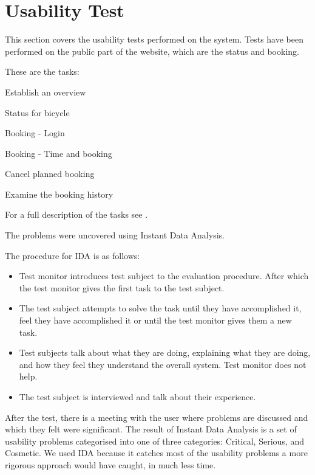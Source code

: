 \section{Usability Test}
This section covers the usability tests performed on the system.
Tests have been performed on the public part of the website, which are the status and booking.

These are the tasks:

\begin{description}[style=nextline]
\item[Task 1] Establish an overview
\item[Task 2] Status for bicycle
\item[Task 3] Booking - Login
\item[Task 4] Booking - Time and booking
\item[Task 5] Cancel planned booking
\item[Task 6] Examine the booking history
\end{description}
For a full description of the tasks see .

The problems were uncovered using Instant Data Analysis.

The procedure for IDA is as follows:

\begin{itemize}
\item Test monitor introduces test subject to the evaluation procedure. After which the test monitor gives the first task to the test subject.
\item The test subject attempts to solve the task until they have accomplished it, feel they have accomplished it or until the test monitor gives them a new task.
\item Test subjects talk about what they are doing, explaining what they are doing, and how they feel they understand the overall system. Test monitor does not help.
\item The test subject is interviewed and talk about their experience.
\end{itemize}\citep{misc:usabilitytest}

After the test, there is a meeting with the user where problems are discussed and which they felt were significant.
The result of Instant Data Analysis is a set of usability problems categorised into one of three categories: Critical, Serious, and Cosmetic.
We used IDA because it catches most of the usability problems a more rigorous approach would have caught, in much less time.

